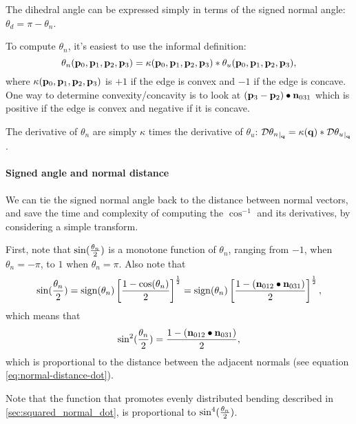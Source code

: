 The dihedral angle can be expressed simply in terms of the
signed normal angle: $\theta_d = \pi - \theta_n$.

To compute $\theta_n$,
it's easiest to use the informal definition:
\begin{equation}
\theta_n({\mathbf p}_0,{\mathbf p}_1,{\mathbf p}_2,{\mathbf p}_3)
= \kappa({\mathbf p}_0,{\mathbf p}_1,{\mathbf p}_2,{\mathbf p}_3) \ast \theta_u({\mathbf p}_0,{\mathbf p}_1,{\mathbf p}_2,{\mathbf p}_3),
\end{equation}
where $\kappa({\mathbf p}_0,{\mathbf p}_1,{\mathbf p}_2,{\mathbf p}_3)$ is
$+1$ if the edge is convex
and
$-1$ if the edge is concave.
One way to determine convexity/concavity
is to look at
$\left({\mathbf p}_3 - {\mathbf p}_2 \right) \bullet {\mathbf n}_{031}$
which is positive if the edge is convex
and negative if it is concave.

The derivative of $\theta_n$ are simply $\kappa$
times the derivative of $\theta_u$:
${\mathcal{D}{\theta_n}_{\mid_{{\mathbf q}}}} = \kappa({\mathbf q}) \ast {\mathcal{D}{\theta_u}_{\mid_{{\mathbf q}}}}$.


\paragraph{Signed angle and normal distance}
\label{sec:Signed-angle-and-normal-distance}

We can tie the signed normal angle back 
to the distance between normal vectors,
and save the time and complexity
of computing the $\cos^{-1}$ and its derivatives,
by considering a simple transform.

First, note that $\sin({\theta_n \over 2})$
is a monotone function of $\theta_n$,
ranging from $-1$, when $\theta_n = -\pi$,
to $1$ when $\theta_n = \pi$.
Also note that 
\begin{equation}
\sin({\theta_n \over 2}) 
 = 
\mathrm{sign}(\theta_n) 
\left[ {1 - \cos(\theta_n)} 
\over 2 \right]^{1 \over 2}
 = 
\mathrm{sign}(\theta_n) 
\left[ {1 - \left( {\mathbf n}_{012}\bullet{\mathbf n}_{031} \right)} 
\over 2 \right]^{1 \over 2},
\end{equation}
which means that
\begin{equation}
\sin^2({\theta_n \over 2}) 
= {{1 - \left( {\mathbf n}_{012}\bullet{\mathbf n}_{031} \right)} \over 2},
\end{equation}
which is proportional to the distance between the adjacent normals
(see equation \ref{eq:normal-distance-dot}).

Note that the function that promotes evenly 
distributed bending described in \autoref{sec:squared_normal_dot},
is proportional to $\sin^4({\theta_n \over 2})$. 

